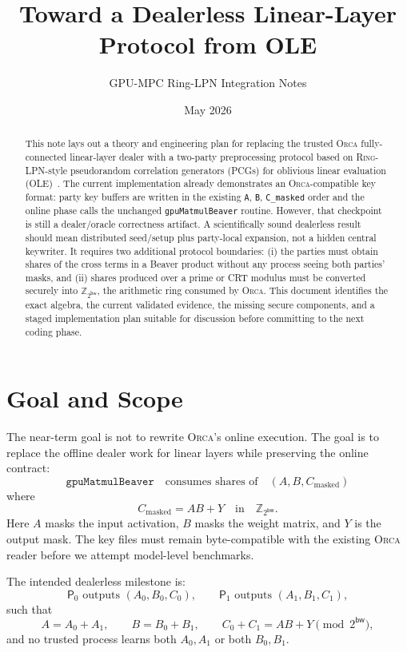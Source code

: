 \documentclass[11pt]{article}
\title{Toward a Dealerless \Orca{} Linear-Layer Protocol from \RingLPN{} OLE}
\author{GPU-MPC Ring-LPN Integration Notes}
\date{May 2026}
\newcommand{\Z}{\mathbb{Z}}
\newcommand{\ServerZero}{\mathsf{P}_0}
\newcommand{\ServerOne}{\mathsf{P}_1}
\newcommand{\modtwo}{\Z_{2^{\mathsf{bw}}}}
\newcommand{\Orca}{\textsc{Orca}}
\newcommand{\RingLPN}{\textsc{Ring-LPN}}
\begin{document}
\maketitle

\begin{abstract}
This note lays out a theory and engineering plan for replacing the trusted
\Orca{} fully-connected linear-layer dealer with a two-party preprocessing
protocol based on \RingLPN{}-style pseudorandom correlation generators
(PCGs) for oblivious linear evaluation (OLE)~\cite{boyle2022ringlpn}. The
current implementation already demonstrates an \Orca{}-compatible key format:
party key buffers are written in the existing \texttt{A}, \texttt{B},
\texttt{C\_masked} order and the online phase calls the unchanged
\texttt{gpuMatmulBeaver} routine. However, that checkpoint is still a
dealer/oracle correctness artifact. A scientifically sound dealerless result
should mean distributed seed/setup plus party-local expansion, not a hidden
central keywriter. It requires two additional protocol boundaries: (i) the
parties must obtain shares of the cross terms in a Beaver product without any
process seeing both parties' masks, and (ii) shares produced over a prime or
CRT modulus must be converted securely into \(\modtwo\), the arithmetic ring
consumed by \Orca{}. This document identifies the exact algebra, the current
validated evidence, the missing secure components, and a staged
implementation plan suitable for discussion before committing to the next
coding phase.
\end{abstract}

\section{Goal and Scope}

The near-term goal is not to rewrite \Orca{}'s online execution. The goal is
to replace the offline dealer work for linear layers while preserving the
online contract:
\[
  \texttt{gpuMatmulBeaver}
  \quad \text{consumes shares of} \quad
  (A, B, C_{\mathrm{masked}})
\]
where
\[
  C_{\mathrm{masked}} = A B + Y
  \quad \text{in} \quad \modtwo .
\]
Here \(A\) masks the input activation, \(B\) masks the weight matrix, and
\(Y\) is the output mask. The key files must remain byte-compatible with the
existing \Orca{} reader before we attempt model-level benchmarks.

The intended dealerless milestone is:
\[
  \ServerZero \text{ outputs } (A_0,B_0,C_0), \qquad
  \ServerOne \text{ outputs } (A_1,B_1,C_1),
\]
such that
\[
  A = A_0 + A_1,\qquad
  B = B_0 + B_1,\qquad
  C_0 + C_1 = AB + Y
  \pmod {2^{\mathsf{bw}}},
\]
and no trusted process learns both \(A_0,A_1\) or both \(B_0,B_1\).
\end{document}
